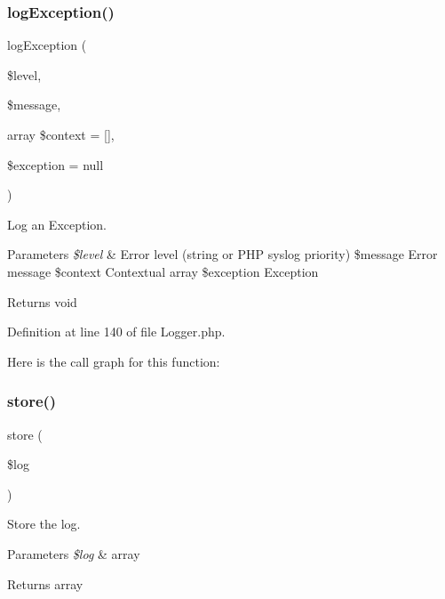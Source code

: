 \subsubsection{\texorpdfstring{log\+Exception()}{logException()}}
{\footnotesize\ttfamily log\+Exception (\begin{DoxyParamCaption}\item[{}]{\$level,  }\item[{}]{\$message,  }\item[{array}]{\$context = {\ttfamily \mbox{[}\mbox{]}},  }\item[{}]{\$exception = {\ttfamily null} }\end{DoxyParamCaption})}

Log an Exception.


\begin{DoxyParams}{Parameters}
{\em \$level} & Error level (string or P\+HP syslog priority) \$message Error message \$context Contextual array \$exception Exception\\
\hline
\end{DoxyParams}
\begin{DoxyReturn}{Returns}
void 
\end{DoxyReturn}


Definition at line 140 of file Logger.\+php.

Here is the call graph for this function\+:
\mbox{\label{class_zest_1_1_common_1_1_logger_1_1_logger_a098c8f4c30f69fc243717fa32eb4ddbf}} 
\subsubsection{\texorpdfstring{store()}{store()}}
{\footnotesize\ttfamily store (\begin{DoxyParamCaption}\item[{}]{\$log }\end{DoxyParamCaption})}

Store the log.


\begin{DoxyParams}{Parameters}
{\em \$log} & array\\
\hline
\end{DoxyParams}
\begin{DoxyReturn}{Returns}
array 
\end{DoxyReturn}



